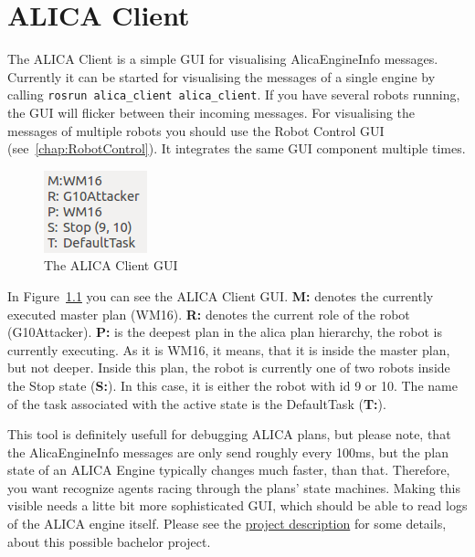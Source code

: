 \chapter{ALICA Client}
\label{chap:ALICAClient}

The ALICA Client is a simple GUI for visualising AlicaEngineInfo messages. Currently it can be started for visualising the messages of a single engine by calling \verb#rosrun alica_client alica_client#. If you have several robots running, the GUI will flicker between their incoming messages. For visualising the messages of multiple robots you should use the Robot Control GUI (see~\ref{chap:RobotControl}). It integrates the same GUI component multiple times.

\begin{figure}[htbp]
 \centering
 \includegraphics[scale=0.8]{pic/AlicaClient.png}
 \caption{The ALICA Client GUI}
 \label{fig:ALICAClient}
\end{figure}

In Figure~\ref{fig:ALICAClient} you can see the ALICA Client GUI. \textbf{M:} denotes the currently executed master plan (WM16). \textbf{R:} denotes the current role of the robot (G10Attacker). \textbf{P:} is the deepest plan in the alica plan hierarchy, the robot is currently executing. As it is WM16, it means, that it is inside the master plan, but not deeper. Inside this plan, the robot is currently one of two robots inside the Stop state (\textbf{S:}). In this case, it is either the robot with id 9 or 10. The name of the task associated with the active state is the DefaultTask (\textbf{T:}).

This tool is definitely usefull for debugging ALICA plans, but please note, that the AlicaEngineInfo messages are only send roughly every 100ms, but the plan state of an ALICA Engine typically changes much faster, than that. Therefore, you want recognize agents racing through the plans' state machines. Making this visible needs a litte bit more sophisticated GUI, which should be able to read logs of the ALICA engine itself. Please see the \href{http://www.uni-kassel.de/eecs/fileadmin/datas/fb16/Fachgebiete/VS/Documents/ProjectsAndTheses/alica_client.pdf}{project description} for some details, about this possible bachelor project.



